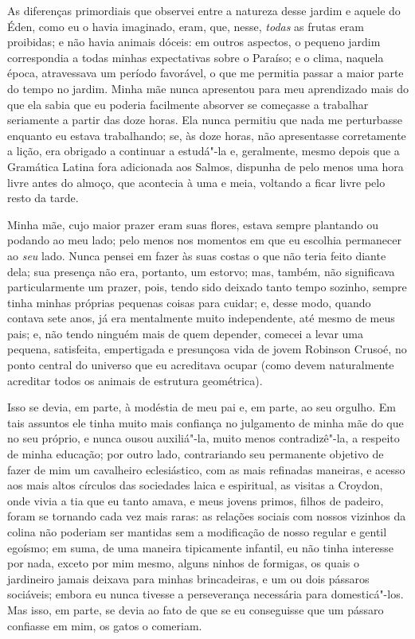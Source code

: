 {{{{{{{{{{{{%
As diferenças primordiais que observei entre a natureza desse jardim
e aquele do Éden, como eu o havia imaginado, eram, que, nesse,
\textit{todas} as frutas eram proibidas; e não havia animais dóceis: em
outros aspectos, o pequeno jardim correspondia a todas minhas
expectativas sobre o Paraíso; e o clima, naquela época, atravessava um
período favorável, o que me permitia passar a maior parte do tempo no
jardim. Minha mãe nunca apresentou para meu aprendizado mais do que ela
sabia que eu poderia facilmente absorver se começasse a trabalhar
seriamente a partir das doze horas. Ela nunca permitiu que nada me
perturbasse enquanto eu estava trabalhando; se, às doze horas, não
apresentasse corretamente a lição, era obrigado a continuar a estudá"-la
e, geralmente, mesmo depois que a Gramática Latina fora adicionada aos
Salmos, dispunha de pelo menos uma hora livre antes do almoço, que
acontecia à uma e meia, voltando a ficar livre pelo resto da tarde.

Minha mãe, cujo maior prazer eram suas flores, estava sempre
plantando ou podando ao meu lado; pelo menos nos momentos em que eu
escolhia permanecer ao \textit{seu} lado. Nunca pensei em fazer às suas
costas o que não teria feito diante dela; sua presença não era,
portanto, um estorvo; mas, também, não significava particularmente um
prazer, pois, tendo sido deixado tanto tempo sozinho, sempre tinha
minhas próprias pequenas coisas para cuidar; e, desse modo, quando
contava sete anos, já era mentalmente muito independente, até mesmo de
meus pais; e, não tendo ninguém mais de quem depender, comecei a levar
uma pequena, satisfeita, empertigada e presunçosa vida de jovem Robinson
Crusoé, no ponto central do universo que eu acreditava ocupar (como
devem naturalmente acreditar todos os animais de estrutura geométrica).

Isso se devia, em parte, à modéstia de meu pai e, em parte, ao seu
orgulho. Em tais assuntos ele tinha muito mais confiança no julgamento
de minha mãe do que no seu próprio, e nunca ousou auxiliá"-la, muito
menos contradizê"-la, a respeito de minha educação; por outro lado,
contrariando seu permanente objetivo de fazer de mim um cavalheiro
eclesiástico, com as mais refinadas maneiras, e acesso aos mais altos
círculos das sociedades laica e espiritual, as visitas a Croydon, onde
vivia a tia que eu tanto amava, e meus jovens primos, filhos de padeiro,
foram se tornando cada vez mais raras: as relações sociais com nossos
vizinhos da colina não poderiam ser mantidas sem a modificação de nosso
regular e gentil egoísmo; em suma, de uma maneira tipicamente infantil,
eu não tinha interesse por nada, exceto por mim mesmo, alguns ninhos de
formigas, os quais o jardineiro jamais deixava para minhas brincadeiras,
e um ou dois pássaros sociáveis; embora eu nunca tivesse a perseverança
necessária para domesticá"-los. Mas isso, em parte, se devia ao fato de
que se eu conseguisse que um pássaro confiasse em mim, os gatos o
comeriam.

}}}}}}}}}}}}
